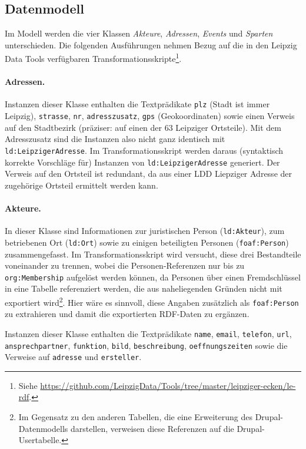 \documentclass[a4paper,11pt]{article}
\begin{document}
\subsection{Datenmodell}

Im Modell werden die vier Klassen \emph{Akteure}, \emph{Adressen},
\emph{Events} und \emph{Sparten} unterschieden.  Die folgenden Ausführungen
nehmen Bezug auf die in den Leipzig Data Tools verfügbaren
Transformationsskripte\footnote{Siehe
  \url{https://github.com/LeipzigData/Tools/tree/master/leipziger-ecken/le-rdf}.}. 

\paragraph{Adressen.}
Instanzen dieser Klasse enthalten die Textprädikate \texttt{plz} (Stadt ist
immer Leipzig), \texttt{strasse}, \texttt{nr}, \texttt{adresszusatz},
\texttt{gps} (Geokoordinaten) sowie einen Verweis auf den Stadtbezirk
(präziser: auf einen der 63 Leipziger Ortsteile).  Mit dem Adresszusatz sind
die Instanzen also nicht ganz identisch mit \texttt{ld:LeipzigerAdresse}. Im
Transformationsskript werden daraus (syntaktisch korrekte Vorschläge für)
Instanzen von \texttt{ld:LeipzigerAdresse} generiert.  Der Verweis auf den
Ortsteil ist redundant, da aus einer LDD Liepziger Adresse der zugehörige
Ortsteil ermittelt werden kann. 

\paragraph{Akteure.}
In dieser Klasse sind Informationen zur juristischen Person
(\texttt{ld:Akteur}), zum betriebenen Ort (\texttt{ld:Ort}) sowie zu einigen
beteiligten Personen (\texttt{foaf:Person}) zusammengefasst.  Im
Transformationsskript wird versucht, diese drei Bestandteile voneinander zu
trennen, wobei die Personen-Referenzen nur bis zu \texttt{org:Membership}
aufgelöst werden können, da Personen über einen Fremdschlüssel in eine Tabelle
referenziert werden, die aus naheliegenden Gründen nicht mit exportiert
wird\footnote{Im Gegensatz zu den anderen Tabellen, die eine Erweiterung des
  Drupal-Datenmodells darstellen, verweisen diese Referenzen auf die
  Drupal-Usertabelle.}. Hier wäre es sinnvoll, diese Angaben zusätzlich als
\texttt{foaf:Person} zu extrahieren und damit die exportierten RDF-Daten zu
ergänzen.

Instanzen dieser Klasse enthalten die Textprädikate \texttt{name},
\texttt{email}, \texttt{telefon}, \texttt{url}, \texttt{ansprech\-partner},
\texttt{funktion}, \texttt{bild}, \texttt{beschreibung},
\texttt{oeffnungszeiten} sowie die Verweise auf \texttt{adresse} und
\texttt{ersteller}.
\end{document}
